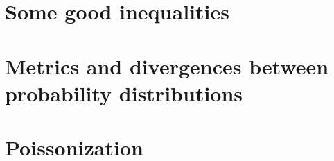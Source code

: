\documentclass[biber]{nowfnt} %
\begin{document}
\appendix

\chapter{Some good inequalities}
  \label{app:inequalities}


\chapter{Metrics and divergences between probability distributions}
  \label{app:distances}


\chapter{Poissonization}
  \label{app:poissonization}


\backmatter  %

\printbibliography
\end{document}
